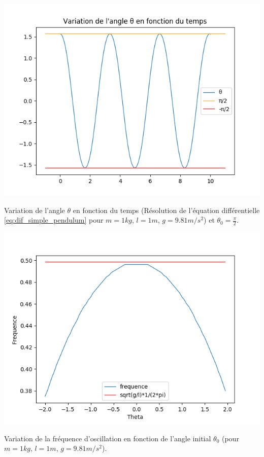 \begin{minipage}[c]{.46\linewidth}
    \centering
    \includegraphics[width=\linewidth]{images/var_theta.png}
    \captionsetup{type=figure}\caption{Variation de l'angle $\theta$ en fonction du temps (Résolution de l'équation différentielle \ref{eq:dif_simple_pendulum} pour $m = 1kg$, $l = 1m$, $g = 9.81m/s^2$) et $\theta_0 = \frac{\pi}{2}$.}
    \label{fig:var_theta}
\end{minipage}
\hfill%
\begin{minipage}[c]{.46\linewidth}
    \centering
    \includegraphics[width=\linewidth]{images/var_freq.png}
    \captionsetup{type=figure}\caption{Variation de la fréquence d'oscillation en fonction de l'angle initial $\theta_0$ (pour $m = 1kg$, $l = 1m$, $g = 9.81m/s^2$).}
    \label{fig:var_freq}
\end{minipage}


